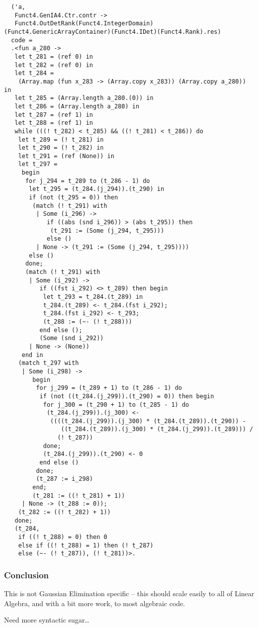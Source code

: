 \documentclass{beamer}
\begin{document}
\begin{frame}[fragile]
\begin{small}
\begin{verbatim}
  ('a,
   Funct4.GenIA4.Ctr.contr ->
   Funct4.OutDetRank(Funct4.IntegerDomain)(Funct4.GenericArrayContainer)(Funct4.IDet)(Funct4.Rank).res)
  code =
  .<fun a_280 ->
   let t_281 = (ref 0) in
   let t_282 = (ref 0) in
   let t_284 =
    (Array.map (fun x_283 -> (Array.copy x_283)) (Array.copy a_280)) in
   let t_285 = (Array.length a_280.(0)) in
   let t_286 = (Array.length a_280) in
   let t_287 = (ref 1) in
   let t_288 = (ref 1) in
   while (((! t_282) < t_285) && ((! t_281) < t_286)) do
    let t_289 = (! t_281) in
    let t_290 = (! t_282) in
    let t_291 = (ref (None)) in
    let t_297 =
     begin
      for j_294 = t_289 to (t_286 - 1) do
       let t_295 = (t_284.(j_294)).(t_290) in
       if (not (t_295 = 0)) then
        (match (! t_291) with
         | Some (i_296) ->
            if ((abs (snd i_296)) > (abs t_295)) then
             (t_291 := (Some (j_294, t_295)))
            else ()
         | None -> (t_291 := (Some (j_294, t_295))))
       else ()
      done;
      (match (! t_291) with
       | Some (i_292) ->
          if ((fst i_292) <> t_289) then begin
           let t_293 = t_284.(t_289) in
           t_284.(t_289) <- t_284.(fst i_292);
           t_284.(fst i_292) <- t_293;
           (t_288 := (~- (! t_288)))
          end else ();
          (Some (snd i_292))
       | None -> (None))
     end in
    (match t_297 with
     | Some (i_298) ->
        begin
         for j_299 = (t_289 + 1) to (t_286 - 1) do
          if (not ((t_284.(j_299)).(t_290) = 0)) then begin
           for j_300 = (t_290 + 1) to (t_285 - 1) do
            (t_284.(j_299)).(j_300) <-
             ((((t_284.(j_299)).(j_300) * (t_284.(t_289)).(t_290)) -
                ((t_284.(t_289)).(j_300) * (t_284.(j_299)).(t_289))) /
               (! t_287))
           done;
           (t_284.(j_299)).(t_290) <- 0
          end else ()
         done;
         (t_287 := i_298)
        end;
        (t_281 := ((! t_281) + 1))
     | None -> (t_288 := 0));
    (t_282 := ((! t_282) + 1))
   done;
   (t_284,
    if ((! t_288) = 0) then 0
    else if ((! t_288) = 1) then (! t_287)
    else (~- (! t_287)), (! t_281))>.
\end{verbatim}
\end{small}
\end{frame}

\begin{frame}
    \frametitle{Conclusion}
    This is not Gaussian Elimination specific -- this should scale
    easily to all of Linear Algebra, and with a bit more work, to
    most algebraic code.

    Need more syntactic sugar\dots
\end{frame}
\end{document}
